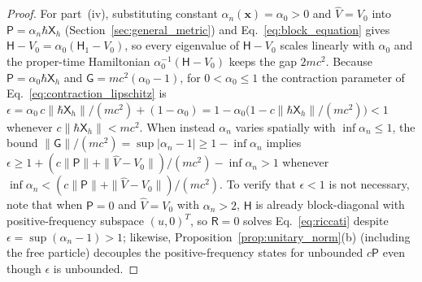 \documentclass[aps,prd,onecolumn,tightenlines,nofootinbib,notitlepage,11pt,floatfix]{revtex4-2}
\theoremstyle{indentedtheorem}
\begin{document}
\begin{proof}
For part~(iv), substituting constant $\alpha_n(\mathbf{x})=\alpha_0>0$ and $\hat{V}=V_0$ into $\mathsf{P}=\alpha_n\hbar\mathsf{X}_h$ (Section~\ref{sec:general_metric}) and Eq.~\eqref{eq:block_equation} gives $\mathsf{H}-V_0 = \alpha_0(\mathsf{H}_1-V_0)$, so every eigenvalue of $\mathsf{H}-V_0$ scales linearly with $\alpha_0$ and the proper-time Hamiltonian $\alpha_0^{-1}(\mathsf{H}-V_0)$ keeps the gap $2mc^2$. Because $\mathsf{P}=\alpha_0\hbar\mathsf{X}_h$ and $\mathsf{G}=mc^2(\alpha_0-1)$, for $0<\alpha_0\le 1$ the contraction parameter of Eq.~\eqref{eq:contraction_lipschitz} is $\epsilon = \alpha_0\,c\|\hbar\mathsf{X}_h\|/(mc^2) + (1-\alpha_0) = 1 - \alpha_0\big(1 - c\|\hbar\mathsf{X}_h\|/(mc^2)\big) < 1$ whenever $c\|\hbar\mathsf{X}_h\| < mc^2$. When instead $\alpha_n$ varies spatially with $\inf\alpha_n\le 1$, the bound $\|\mathsf{G}\|/(mc^2) = \sup|\alpha_n - 1| \ge 1 - \inf\alpha_n$ implies $\epsilon \ge 1 + (c\|\mathsf{P}\|+\|\hat{V}-V_0\|)/(mc^2) - \inf\alpha_n > 1$ whenever $\inf\alpha_n < (c\|\mathsf{P}\|+\|\hat{V}-V_0\|)/(mc^2)$. To verify that $\epsilon<1$ is not necessary, note that when $\mathsf{P}=0$ and $\hat{V}=V_0$ with $\alpha_n > 2$, $\mathsf{H}$ is already block-diagonal with positive-frequency subspace $(u,0)^T$, so $\mathsf{R}=0$ solves Eq.~\eqref{eq:riccati} despite $\epsilon = \sup(\alpha_n - 1) > 1$; likewise, Proposition~\ref{prop:unitary_norm}(b) (including the free particle) decouples the positive-frequency states for unbounded $c\mathsf{P}$ even though $\epsilon$ is unbounded.
\end{proof}
\end{document}
